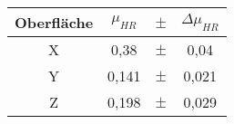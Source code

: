 \begin{tabular}{c|ccc}
    Oberfläche & $\mu_{HR}$ & $\pm$ & $\Delta \mu_{HR}$ \\ \hline
    X & 0,38 & $\pm$ & 0,04 \\
    Y & 0,141 & $\pm$ & 0,021 \\
    Z & 0,198 & $\pm$ & 0,029
\end{tabular}